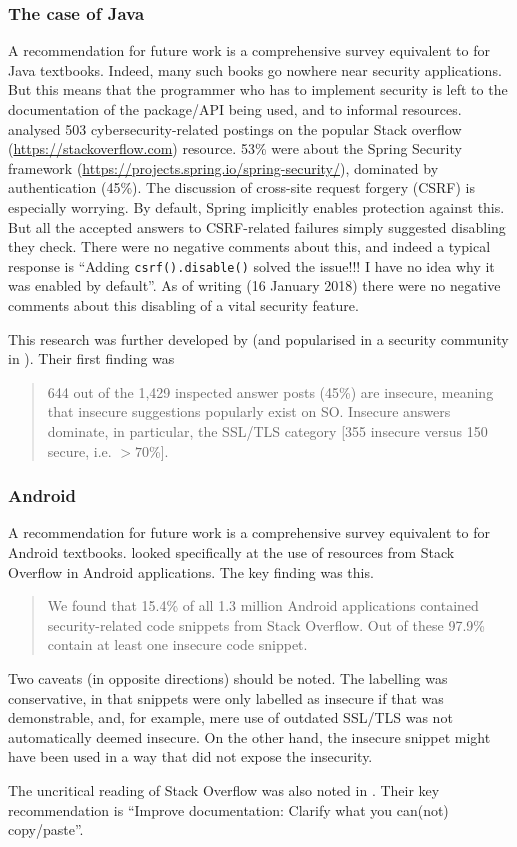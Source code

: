 \documentclass[conference]{IEEEtran}
\begin{document}
\subsubsection{The case of Java}\label{sec:Java}
A recommendation for future work is a comprehensive survey equivalent to \cite{Drop2019} for  Java textbooks. Indeed, many such books go nowhere near security applications.  But this means that the programmer who has to implement security is left to the documentation of the package/API being used, and to informal resources. \cite{Mengetal2018a} analysed 503 cybersecurity-related postings on the popular Stack overflow (\url{https://stackoverflow.com}) resource.  53\% were about the Spring Security framework (\url{https://projects.spring.io/spring-security/}), dominated by authentication (45\%). The discussion \cite[\S4.3.1]{Mengetal2018a} of cross-site request forgery (CSRF) is especially worrying.  By default, Spring implicitly enables protection against this. But all the accepted answers to CSRF-related failures simply suggested disabling they check. There were no negative comments about this, and indeed a typical response is ``Adding \verb!csrf().disable()!
solved the issue!!! I have no idea why it was enabled by default''. As of writing (16 January 2018) there were no negative comments about this disabling of a vital security feature.
\par
This research was further developed by \cite{Chenetal2019a}  (and popularised in a security community in \cite{Zorz2019a}). Their first finding was
\begin{quote}
644 out of the 1,429 inspected answer posts
(45\%) are insecure, meaning that insecure suggestions
popularly exist on SO. Insecure answers dominate, in
particular, the SSL/TLS category [355 insecure versus 150 secure, i.e. $>70$\%].
\end{quote} 

\subsubsection{Android}\label{sec:Android}
A recommendation for future work is a comprehensive survey equivalent to \cite{Drop2019} for Android textbooks. \cite{Fischeretal2017a} looked specifically at the use of resources from Stack Overflow in Android applications. The key finding was this.
\begin{quote}
We found that 15.4\% of all 1.3 million Android applications
contained security-related code snippets from
Stack Overflow. Out of these 97.9\% contain at least one
insecure code snippet.
\end{quote}
Two caveats (in opposite directions) should be noted. The labelling was conservative, in that snippets were only labelled as insecure if that was demonstrable, and, for example, mere use of outdated SSL/TLS was not automatically deemed insecure. On the other hand, the insecure snippet might have been used in a way that did not expose the insecurity.
\par
The uncritical reading of Stack Overflow was also noted in \cite[Slide 29]{Votipkaetal2019a}. Their key recommendation  \cite[Slide 32]{Votipkaetal2019a} is ``Improve documentation: Clarify what you can(not) copy/paste''. 
\end{document}
